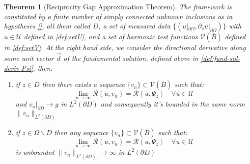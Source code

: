 \documentclass[10pt, a4paper, twoside, openright]{book}
\theoremstyle{definition}
\theoremstyle{plain}
\newtheorem{theorem}[subsection]{Theorem}
\theoremstyle{plain}
\theoremstyle{plain}
\theoremstyle{plain}
\theoremstyle{plain}
\theoremstyle{plain}
\theoremstyle{plain}
\theoremstyle{plain}
\begin{document}
\begin{theorem}[Reciprocity Gap Approximation Theorem]
 \label{theo:approximation-rg} 
 The framework is constituted by a finite number of simply connected unknown inclusions as in hypotheses \ref{}, all them called $D$, a set of measured data $\{(u|_{\partial \Omega},\partial_\nu u|_{\partial \Omega})\}$ with $u\in\mathcal{U}$ defined in \ref{def:setU}, and a set of harmonic test functions $\mathcal{V}(\overline{B})$ defined in \ref{def:setV}. At the right hand side, we
 consider the directional derivative along some unit vector $\vec{d}$ of the fundamental solution, defined above in \ref{def:fund-sol-deriv-Psi}, then:
 \begin{enumerate}
  \item if $z \in D$ then there exists a sequence $\{v_n\} \subset \mathcal{V}(\overline{B})$ such that:
   \begin{equation}
     \lim_{n\to\infty}\mathcal{R}(u,v_n) = \mathcal{R}(u,\Psi_z)\quad\forall u\in\mathcal{U}
   \end{equation}
   and $v_n|_{\partial D}\to g$ in $L^2(\partial D)$ and consequently  it's bounded in the same norm $\|v_n\|_{L^2(\partial D)}$
  \item if $z \in \Omega \backslash D$ then any sequence $\{v_n\} \subset \mathcal{V}(\overline{B})$ such that:
   \begin{equation}
     \lim_{n\to\infty}\mathcal{R}(u,v_n) = \mathcal{R}(u,\Psi_z)\quad\forall u\in\mathcal{U}
   \end{equation}
   is unbounded $\|v_n\|_{L^2(\partial D)}\to\infty$ in $L^2(\partial D)$
 \end{enumerate}
\end{theorem}
\end{document}
